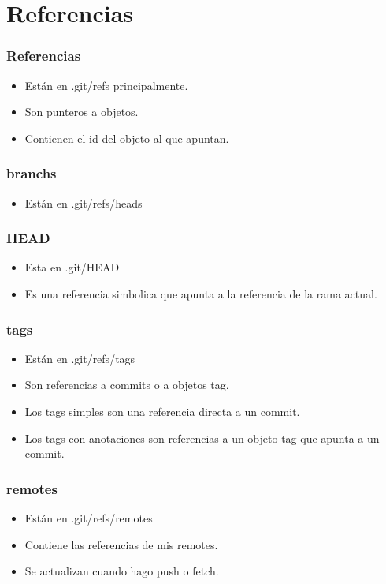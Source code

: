 \documentclass[10pt]{beamer}
\begin{document}
  \section*{Referencias}

  \begin{frame}
    \frametitle{Referencias}
    \begin{itemize}
        \item Están en .git/refs principalmente.
        \item Son punteros a objetos.
        \item Contienen el id del objeto al que apuntan.
    \end{itemize}
  \end{frame}

  \begin{frame}
    \frametitle{branchs}
    \begin{itemize}
        \item Están en .git/refs/heads
    \end{itemize}
  \end{frame}

  \begin{frame}
    \frametitle{HEAD}
    \begin{itemize}
        \item Esta en .git/HEAD
        \item Es una referencia simbolica que apunta a la referencia de la rama actual.
    \end{itemize}
  \end{frame}

  \begin{frame}
    \frametitle{tags}
    \begin{itemize}
        \item Están en .git/refs/tags
        \item Son referencias a commits o a objetos tag.
        \item Los tags simples son una referencia directa a un commit.
        \item Los tags con anotaciones son referencias a un objeto tag que apunta a un commit.
    \end{itemize}
  \end{frame}

  \begin{frame}
    \frametitle{remotes}
    \begin{itemize}
        \item Están en .git/refs/remotes
        \item Contiene las referencias de mis remotes.
        \item Se actualizan cuando hago push o fetch.
    \end{itemize}
  \end{frame}
\end{document}
